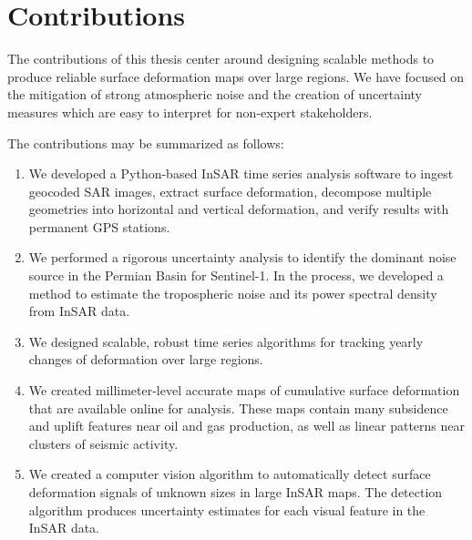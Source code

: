 \documentclass{utexasthesis}
\begin{document}
% 





\section{Contributions}
\label{sec:chap1-contributions}


The contributions of this thesis center around designing scalable methods to produce reliable surface deformation maps over large regions. We have focused on the mitigation of strong atmospheric noise and the creation of uncertainty measures which are easy to interpret for non-expert stakeholders.


The contributions may be summarized as follows:

\begin{enumerate}

\item We developed a Python-based InSAR time series analysis software to ingest geocoded SAR images, extract surface deformation, decompose multiple geometries into horizontal and vertical deformation, and verify results with permanent GPS stations.

\item We performed a rigorous uncertainty analysis to identify the dominant noise source in the Permian Basin for Sentinel-1.  In the process, we developed a method to estimate the tropospheric noise and its power spectral density from InSAR data.


\item We designed scalable, robust time series algorithms for tracking yearly changes of deformation over large regions.

\item We created millimeter-level accurate maps of cumulative surface deformation that are available online for analysis. These maps contain many subsidence and uplift features near oil and gas production, as well as linear patterns near clusters of seismic activity.


\item We created a computer vision algorithm to automatically detect surface deformation signals of unknown sizes in large InSAR maps. The detection algorithm produces uncertainty estimates for each visual feature in the InSAR data.



\end{enumerate}
\end{document}
